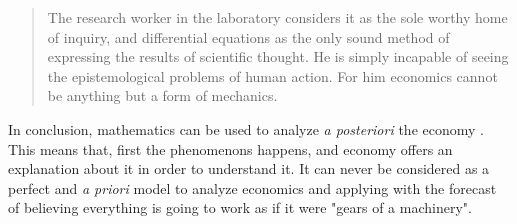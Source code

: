 \documentclass[12pt,a4paper,twoside]{book}
\begin{document}
\begin{quotation}
The research worker in the laboratory considers it as the sole worthy home of inquiry, and differential equations as the only sound method of expressing the results of scientific thought. He is simply incapable of seeing the epistemological problems of human action. For him economics cannot be anything but a form of mechanics. \cite[p. 8]{mises:ha}
\end{quotation}

In conclusion, mathematics can be used to analyze \textit{a posteriori} the economy . This means that, first the phenomenons happens, and economy offers an explanation about it in order to understand it. It can never be considered as a perfect and \textit{a priori} model to analyze economics and applying with the forecast of believing everything is going to work as if it were "gears of a machinery".




\end{document}
